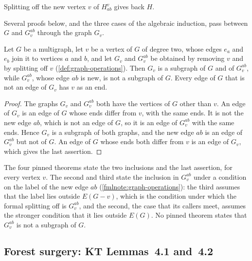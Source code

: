 Splitting off the new vertex $v$ of $H_{ab}^v$ gives back $H$.

Several proofs below, and the three cases of the algebraic induction,
pass between $G$ and $G_v^{ab}$ through the graph $G_v$.

\begin{lemma}
  \label{lem:splitoff-edge-substitution}
  \leanok
  Let $G$ be a multigraph, let $v$ be a vertex of $G$ of degree two,
  whose edges $e_a$ and $e_b$ join it to vertices $a$ and $b$, and let
  $G_v$ and $G_v^{ab}$ be obtained by removing $v$ and by splitting off
  $v$ (\cref{def:graph-operations}). Then $G_v$ is a subgraph of $G$ and of
  $G_v^{ab}$, while $G_v^{ab}$, whose edge $ab$ is new, is not a
  subgraph of $G$. Every edge of $G$ that is not an edge of $G_v$ has
  $v$ as an end.
\end{lemma}
\begin{proof}
  \leanok
  The graphs $G_v$ and $G_v^{ab}$ both have the vertices of $G$ other
  than $v$. An edge of $G_v$ is an edge of $G$ whose ends differ from
  $v$, with the same ends. It is not the new edge $ab$, which is not an
  edge of $G$, so it is an edge of $G_v^{ab}$ with the same ends. Hence
  $G_v$ is a subgraph of both graphs, and the new edge $ab$ is an edge
  of $G_v^{ab}$ but not of $G$. An edge of $G$ whose ends both differ
  from $v$ is an edge of $G_v$, which gives the last assertion.
\end{proof}

\begin{fmlnote}
  The four pinned theorems state the two inclusions and the last
  assertion, for every vertex $v$. The second and third state the
  inclusion in $G_v^{ab}$ under a condition on the label of the new edge
  $ab$ (\cref{fmlnote:graph-operations}): the third assumes that the label
  lies outside $E(G - v)$, which is the condition under which the formal
  splitting off is $G_v^{ab}$, and the second, the case that its callers
  meet, assumes the stronger condition that it lies outside $E(G)$. No
  pinned theorem states that $G_v^{ab}$ is not a subgraph of $G$.
\end{fmlnote}

\subsection{Forest surgery: KT Lemmas~4.1 and~4.2}
\label{sec:molecular-induction-forest}

